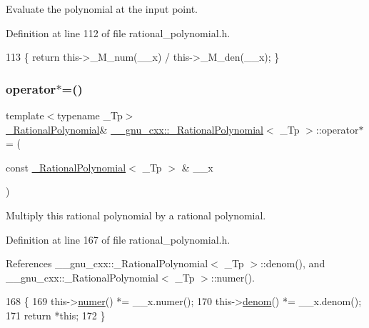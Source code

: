 Evaluate the polynomial at the input point. 

Definition at line 112 of file rational\+\_\+polynomial.\+h.


\begin{DoxyCode}
113       \{ \textcolor{keywordflow}{return} this->\_M\_num(\_\_x) / this->\_M\_den(\_\_x); \}
\end{DoxyCode}
\mbox{\label{class____gnu__cxx_1_1__RationalPolynomial_a3905ba0616e848fb7daa18dd01481b78}} 
\subsubsection{\texorpdfstring{operator$\ast$=()}{operator*=()}}
{\footnotesize\ttfamily template$<$typename \+\_\+\+Tp$>$ \\
\hyperlink{class____gnu__cxx_1_1__RationalPolynomial}{\+\_\+\+Rational\+Polynomial}\& \hyperlink{class____gnu__cxx_1_1__RationalPolynomial}{\+\_\+\+\_\+gnu\+\_\+cxx\+::\+\_\+\+Rational\+Polynomial}$<$ \+\_\+\+Tp $>$\+::operator$\ast$= (\begin{DoxyParamCaption}\item[{const \hyperlink{class____gnu__cxx_1_1__RationalPolynomial}{\+\_\+\+Rational\+Polynomial}$<$ \+\_\+\+Tp $>$ \&}]{\+\_\+\+\_\+x }\end{DoxyParamCaption})\hspace{0.3cm}{\ttfamily [inline]}}

Multiply this rational polynomial by a rational polynomial. 

Definition at line 167 of file rational\+\_\+polynomial.\+h.



References \+\_\+\+\_\+gnu\+\_\+cxx\+::\+\_\+\+Rational\+Polynomial$<$ \+\_\+\+Tp $>$\+::denom(), and \+\_\+\+\_\+gnu\+\_\+cxx\+::\+\_\+\+Rational\+Polynomial$<$ \+\_\+\+Tp $>$\+::numer().


\begin{DoxyCode}
168       \{
169         this->\hyperlink{class____gnu__cxx_1_1__RationalPolynomial_aa42ac2f6c2368cae05ba3a3cebf0fa24}{numer}() *= \_\_x.numer();
170         this->\hyperlink{class____gnu__cxx_1_1__RationalPolynomial_a05e84913ccfddcf6fcbfe623cb56c937}{denom}() *= \_\_x.denom();
171         \textcolor{keywordflow}{return} *\textcolor{keyword}{this};
172       \}
\end{DoxyCode}
\mbox{\label{class____gnu__cxx_1_1__RationalPolynomial_af027ee02f3bcd373e420eacec639a596}} 
